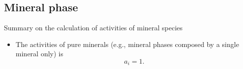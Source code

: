 \subsection{Mineral phase}
%
%
\begin{frame}{Summary on the calculation of activities of mineral species}
\begin{itemize}
\item The activities of pure minerals (e.g., mineral phases composed by
a single mineral only) is
%
\[
a_{i}=1.
\]
\end{itemize}
\end{frame}

